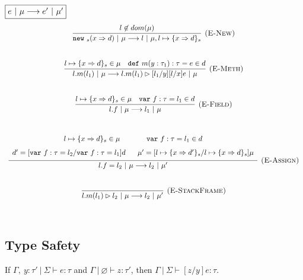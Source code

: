 \documentclass{llncs}
\newcommand{\keywadj}[1]{\mathtt{#1}}
\newcommand{\keyw}[1]{\keywadj{#1}~}
\begin{document}
$\fbox{$e~|~\mu \longrightarrow e'~|~\mu'$}$
\[
\begin{array}{c}
\infer[\textsc{(E-New)}]
  {\keyw{new}_{s}(x \Rightarrow d)~|~\mu \longrightarrow l~|~\mu, l \mapsto \{ x \Rightarrow d \}_{s}}
  {l \not\in dom(\mu)}\\[5ex]
  
\infer[\textsc{(E-Meth)}]
  {l.m(l_1)~|~\mu \longrightarrow l.m(l_1) \rhd [l_1/y][l/x]e~|~\mu}
  {l \mapsto \{ x \Rightarrow d \}_{s} \in \mu & \keyw{def} m(y : \tau_1) : \tau = e \in d}\\[5ex]

\infer[\textsc{(E-Field)}]
  {l.f~|~\mu \longrightarrow l_1~|~\mu}
  {l \mapsto \{ x \Rightarrow d \}_{s} \in \mu & \keyw{var} f:\tau = l_1 \in d}\\[5ex]

\infer[\textsc{(E-Assign)}]
  {l.f = l_2~|~\mu \longrightarrow l_2~|~\mu'}
  {\def\arraystretch{1.6}
  \begin{array}{c}
l \mapsto \{ x \Rightarrow d \}_{s} \in \mu~~~~~~~~~~~\keyw{var} f:\tau = l_1 \in d \\
d' = [\keyw{var} f:\tau = l_2/\keyw{var} f:\tau = l_1]d~~~~~\mu' = [l \mapsto \{ x \Rightarrow d' \}_{s}/l \mapsto \{ x \Rightarrow d \}_{s}]\mu
  \end{array}}\\[5ex]


\infer[\textsc{(E-StackFrame)}]
  {l.m(l_1) \rhd l_2~|~\mu \longrightarrow l_2~|~\mu'}
  {}\\[5ex]
  
\end{array}
\]

\newpage

\subsection{Type Safety}

\begin{lemma}
If $\Gamma,~y : \tau'~|~\Sigma \vdash e : \tau$ and $\Gamma~|~\varnothing \vdash z : \tau'$, then $\Gamma~|~\Sigma \vdash [z/y]e : \tau$.
\end{lemma}
\end{document}
